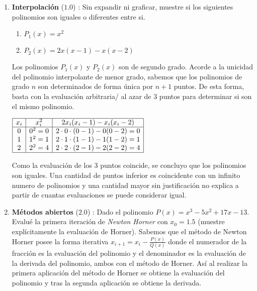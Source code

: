 \documentclass[12pt]{article}
\begin{document}
  \begin{enumerate}[leftmargin=*,widest=9]
    \item \textbf{Interpolación} ($1.0$) : Sin expandir ni graficar, muestre si los siguientes polinomios son iguales o diferentes entre si.
    \begin{enumerate}[label=\alph*]
    \item \(P_1(x) = x^2\)
    \item \(P_2(x) = 2x(x-1)-x(x-2)\)
    \end{enumerate}
    Los polinomios $P_1(x)$ y $P_2(x)$ son de segundo grado. Acorde a la unicidad del polinomio interpolante de menor grado, sabemos que los polinomios de grado $n$ son determinados de forma única por $n+1$ puntos. De esta forma, basta con la evaluación arbitraria/ al azar de 3 puntos para determinar si son el mismo polinomio.
    \begin{center}
    \(    \begin{array}{|c|c|c|}
    \hline
    x_i & x_i^2 & 2x_i(x_i-1)-x_i(x_i-2)\\
    \hline
    0 & 0^2 = 0 & 2\cdot 0 \cdot (0-1)-0(0-2) = 0 \\
    1 & 1^2 = 1 & 2\cdot 1 \cdot (1-1)-1(1-2) = 1 \\
    2 & 2^2 = 4 & 2\cdot 2 \cdot (2-1)-2(2-2) = 4 \\
    \hline
    \end{array} \)
    \end{center}
    Como la evaluación de los 3 puntos coincide, se concluyo que los polinomios son iguales. Una cantidad de puntos inferior es coincidente con un infinito numero de polinomios y una cantidad mayor sin justificación no explica a partir de cuantas evaluaciones se puede considerar igual.
    \item \textbf{Métodos abiertos} ($2.0$) : Dado el polinomio \(P(x) = x^3 - 5x^2 + 17x -13\). Evalué la primera iteración de \textit{Newton Horner} con \(x_0 = 1.5\) (muestre explícitamente la evaluación de Horner).
    Sabemos que el método de Newton Horner posee la forma iterativa \(x_{i+1} = x_i - \frac{P(x)}{Q(x)}\) donde el numerador de la fracción es la evaluación del polinomio y el denominador es la evaluación de la derivada del polinomio, ambos con el método de Horner.
Así al realizar la primera aplicación del método de Horner se obtiene la evaluación del polinomio y tras la segunda aplicación se obtiene la derivada.
\begin{eqnarray*}

\end{eqnarray*}
\end{enumerate}
\end{document}
